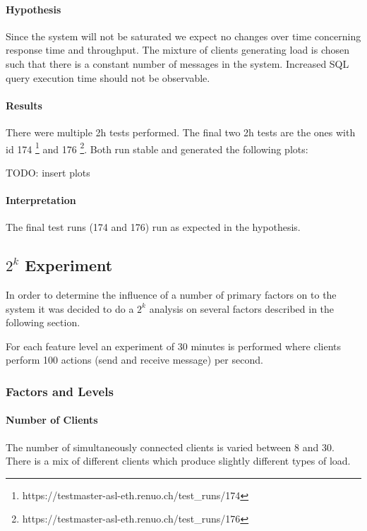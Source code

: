 \documentclass[milestone1.tex]{subfiles}
\begin{document}
\paragraph{Hypothesis}
Since the system will not be saturated we expect no changes over time concerning response time and throughput. The mixture of clients generating load is chosen such that there is a constant number of messages in the system. Increased SQL query execution time should not be observable.

\paragraph{Results}
There were multiple 2h tests performed. The final two 2h tests are the ones with id 174 \footnote{https://testmaster-asl-eth.renuo.ch/test\_runs/174} and 176 \footnote{https://testmaster-asl-eth.renuo.ch/test\_runs/176}. Both run stable and generated the following plots:

TODO: insert plots

\paragraph{Interpretation}
The final test runs (174 and 176) run as expected in the hypothesis.

\subsection{$2^k$ Experiment}
In order to determine the influence of a number of primary factors on to the system it was decided to do a $2^k$ analysis on several factors described in the following section.

For each feature level an experiment of 30 minutes is performed where clients perform 100 actions (send and receive message) per second.

\subsubsection{Factors and Levels}

\paragraph{Number of Clients}
The number of simultaneously connected clients is varied between 8 and 30. There is a mix of different clients which produce slightly different types of load.
\end{document}
